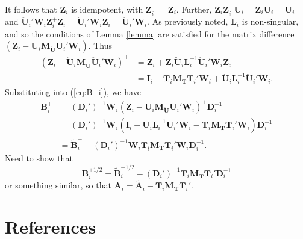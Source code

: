 \documentclass[12pt]{article}
\begin{document}
It follows that \(\mathbf{Z}_i\) is idempotent, with
\(\mathbf{Z}_i^+ = \mathbf{Z}_i\). Further,
\(\mathbf{Z}_i \mathbf{Z}_i^+ \mathbf{\ddot{U}}_i = \mathbf{Z}_i \mathbf{\ddot{U}}_i = \mathbf{\ddot{U}}_i\)
and
\(\mathbf{\ddot{U}}_i' \mathbf{W}_i \mathbf{Z}_i^+ \mathbf{Z}_i = \mathbf{\ddot{U}}_i' \mathbf{W}_i \mathbf{Z}_i = \mathbf{\ddot{U}}_i' \mathbf{W}_i\).
As previously noted, \(\mathbf{L}_i\) is non-singular, and so the
conditions of Lemma \ref{lemma} are satisfied for the matrix difference
\((\mathbf{Z}_i - \mathbf{\ddot{U}}_i \mathbf{M_{\ddot{U}}}\mathbf{\ddot{U}}_i'\mathbf{W}_i)\).
Thus \begin{align*}
(\mathbf{Z}_i - \mathbf{\ddot{U}}_i \mathbf{M_{\ddot{U}}}\mathbf{\ddot{U}}_i'\mathbf{W}_i)^+ &= \mathbf{Z}_i + \mathbf{Z}_i \mathbf{\ddot{U}}_i \mathbf{L}_i^{-1} \mathbf{\ddot{U}}_i' \mathbf{W}_i \mathbf{Z}_i \\
&= \mathbf{I}_i - \mathbf{T}_i \mathbf{M_T}\mathbf{T}_i'\mathbf{W}_i + \mathbf{\ddot{U}}_i \mathbf{L}_i^{-1} \mathbf{\ddot{U}}_i' \mathbf{W}_i.
\end{align*} Substituting into (\ref{eq:B_i}), we have \begin{align}
\mathbf{B}_i^+ &= \left(\mathbf{D}_i'\right)^{-1} \mathbf{W}_i \left(\mathbf{Z}_i - \mathbf{\ddot{U}}_i \mathbf{M_{\ddot{U}}}\mathbf{\ddot{U}}_i'\mathbf{W}_i \right)^+ \mathbf{D}_i^{-1} \nonumber \\
&= \left(\mathbf{D}_i'\right)^{-1} \mathbf{W}_i \left(\mathbf{I}_i + \mathbf{\ddot{U}}_i \mathbf{L}_i^{-1} \mathbf{\ddot{U}}_i' \mathbf{W}_i  - \mathbf{T}_i \mathbf{M_T}\mathbf{T}_i'\mathbf{W}_i\right) \mathbf{D}_i^{-1} \nonumber \\
&= \tilde{\mathbf{B}}_i^+ - \left(\mathbf{D}_i'\right)^{-1} \mathbf{W}_i \mathbf{T}_i \mathbf{M_T}\mathbf{T}_i'\mathbf{W}_i \mathbf{D}_i^{-1}.
\end{align} Need to show that \[
\mathbf{B}_i^{+1/2} = \tilde{\mathbf{B}}_i^{+1/2} - \left(\mathbf{D}_i'\right)^{-1} \mathbf{T}_i \mathbf{M_T}\mathbf{T}_i'\mathbf{D}_i^{-1}
\] or something similar, so that
\(\mathbf{A}_i = \tilde{\mathbf{A}}_i - \mathbf{T}_i \mathbf{M_T}\mathbf{T}_i'\).

\hypertarget{references}{%
\section*{References}\label{references}}
\end{document}
